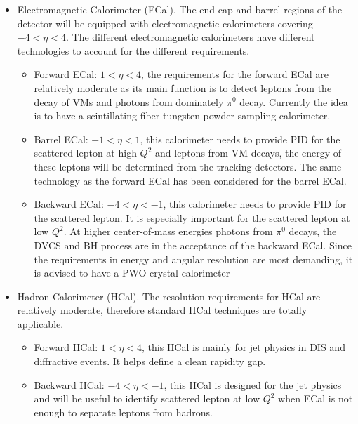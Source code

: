 \begin{itemize}
\item Electromagnetic Calorimeter (ECal). The end-cap and barrel regions of
the detector will be equipped with electromagnetic calorimeters covering
$-4<\eta<4$. The different electromagnetic calorimeters have different technologies to account for the different requirements. 


\begin{itemize}
\item Forward ECal: $1<\eta<4$, the requirements for the forward ECal are relatively
moderate as its main function is to detect leptons from the decay of VMs and
photons from dominately $\pi^{0}$ decay. Currently the idea is to have a scintillating fiber tungsten
powder sampling calorimeter. 
\item Barrel ECal: $-1<\eta<1$, this calorimeter needs to provide PID for the scattered lepton at high $Q^{2}$ and leptons from VM-decays, the energy of these leptons will be determined from the tracking detectors. 
The same technology as the forward ECal has been considered for the barrel ECal.
\item Backward ECal: $-4<\eta<-1$, this calorimeter needs to provide PID for the scattered
lepton. It is especially important for the scattered lepton at low $Q^{2}$. At
higher center-of-mass energies photons from $\pi^{0}$ decays, the DVCS and BH
process are in the acceptance of the backward ECal. Since the requirements in
energy and angular resolution are most demanding, it is advised to have a PWO
crystal calorimeter
\end{itemize}
\end{itemize}

\begin{itemize}
\item Hadron Calorimeter (HCal). The resolution requirements for HCal are relatively moderate, therefore standard HCal techniques are totally applicable.  

\begin{itemize}

\item Forward HCal: $1<\eta<4$, this HCal is mainly for jet physics in DIS and diffractive events. It helps define a clean rapidity gap.

\item Backward HCal: $-4<\eta<-1$, this HCal is designed for the jet physics and will be useful to identify scattered lepton at low $Q^{2}$
when ECal is not enough to separate leptons from hadrons. 

\end{itemize}
\end{itemize}


